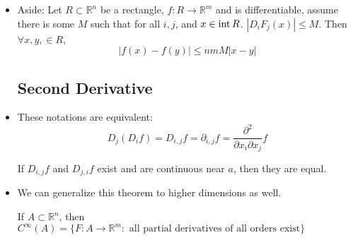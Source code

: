 \begin{itemize}
\begin{proof}
        Set $b_1=(a_1+h_1,\dots,a_i+h_i,\dots,a_n)$ so $b_0=a,b_n=a+h$. Then 
        \begin{align}
            e(h) &= f(a+h)-f(a) - \sum (\partial_i f)(a) \cdot h_i \\ 
            &= f(b_n)-f(b_0)-\sum (\partial_i f)(a) \cdot h_i \\ 
            &= \sum f(b_i)-f(b_{i-1})-\sum (\partial_i f)(a) \cdot h_i
        \end{align}
        which by the mean value theorem, there exists $c_i$ in between $b_{i-1}$ and $b_{i}$ such that 
        \begin{equation}
            c_i = (a_1+h_1, a_{i-1}+h_{hi-1},\gamma_i, a_{i+1},a_n)
        \end{equation}
        where $\gamma_i \in (a_i, a_i + h_i)$. Then:
        \begin{equation}
            \sum (D_i F)(c_i)h_i - (D_if)(a)h_i = \sum_{i=1}^n ((D_if)(c_i)-(D_if)(a))h_i = e(h)
        \end{equation} 
        We want to now compute 
        \begin{align}
            \lim_{h\to 0} \frac{|e(h)|}{|h|} &= \lim_{h\to 0} \frac{\left|\sum (D_i F)(c_i)h_i - (D_if)(a)h_i = \sum_{i=1}^n ((D_if)(c_i)-(D_if)(a))h_i\right|}{|h|} 
        \end{align}
        and we need to show that 
        \begin{equation}
            0 = \lim_{h\to 0} \sum |D_if(c_i)-(D_if)(a)| \cdot \frac{|h_i|}{h}
        \end{equation}
        As $h\to 0$, $c_i\to a$. By continuity of $\partial_i f$, we know $D_if(c_i)-D_i(f_a)\to 0$, so the above limit is zero.
    \end{proof}
    \item Aside: Let $R\subset \mathbb{R}^n$ be a rectangle, $f:R \to \mathbb{R}^m$ and is differentiable, assume there is some $M$ such that for all $i,j$, and $x\in \operatorname{int} R$. $|D_i F_j(x)| \le M$. Then $\forall x,y,\in R$,
    \begin{equation}
        |f(x)-f(y)| \le nmM|x-y|
    \end{equation}
    \subsection{Second Derivative}
    \item These notations are equivalent:
    \begin{equation}
        D_j(D_if)=D_{i,j}f = \partial_{i,j}f = \frac{\partial^2}{\partial x_i \partial x_j}f
    \end{equation}
    \begin{theorem}
        If $D_{i,j}f$ and $D_{j,i}f$ exist and are continuous near $a$, then they are equal.
    \end{theorem}
    \item We can generalize this theorem to higher dimensions as well.
    \begin{definition}
        If $A \subset \mathbb{R}^n$, then $C^\infty (A) = \{F: A \rightarrow \mathbb{R}^m:\text{ all partial derivatives of all orders exist}\}$
    \end{definition}

\end{itemize}
